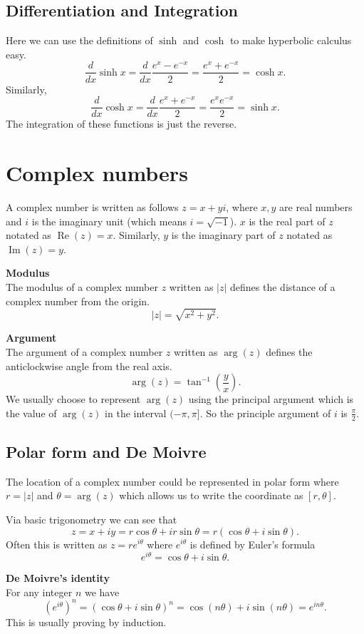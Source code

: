 \documentclass[10pt, a4paper]{article}
\begin{document}
\subsection{Differentiation and Integration}
Here we can use the definitions of $\sinh$ and $\cosh$ to make hyperbolic calculus easy.
\[
\frac{d}{dx}\sinh x = \frac{d}{dx}\frac{e ^ x - e ^ {-x}}{2} = \frac{e ^ x + e ^ {-x}}{2} = \cosh x.
\]
Similarly,
\[
\frac{d}{dx}\cosh x = \frac{d}{dx}\frac{e ^ x + e ^ {-x}}{2} = \frac{e ^ x  e ^ {-x}}{2} = \sinh x.
\]
The integration of these functions is just the reverse.

\newpage

\section{Complex numbers}
A complex number is written as follows $z = x + yi$, where $x, y$ are real numbers and $i$ is the imaginary unit (which means $i = \sqrt{-1}$). $x$ is the real part of $z$ notated as $\operatorname{Re}(z) = x$. Similarly, $y$ is the imaginary part of $z$ notated as $\operatorname{Im}(z) = y$.

\textbf{Modulus} \\
The modulus of a complex number $z$ written as $|z|$ defines the distance of a complex number from the origin.
\[
|z| = \sqrt{x ^ 2 + y ^ 2}.
\]

\textbf{Argument} \\
The argument of a complex number $z$ written as $\arg (z)$ defines the anticlockwise angle from the real axis. 
\[
\arg (z) = \tan ^ {-1} \left(\frac{y}{x}\right).
\]
We usually choose to represent $\arg (z)$ using the principal argument which is the value of $\arg (z)$ in the interval $(-\pi, \pi]$. So the principle argument of $i$ is $\frac{\pi}{2}$.

\subsection{Polar form and De Moivre}
The location of a complex number could be represented in polar form where $r = |z|$ and $\theta = \arg (z)$ which allows us to write the coordinate as $[r, \theta]$.

Via basic trigonometry we can see that
\[
z = x + iy = r\cos\theta + ir\sin\theta = r(\cos\theta + i\sin\theta).
\]
Often this is written as $z = re ^ {i\theta}$ where $e ^ {i\theta}$ is defined by Euler's formula
\[
e ^ {i\theta} = \cos\theta + i\sin\theta.
\]

\textbf{De Moivre's identity} \\
For any integer $n$ we have
\[
\left(e ^ {i\theta}\right) ^ n = (\cos\theta + i\sin\theta) ^ n = \cos (n\theta) + i\sin (n\theta) = e ^ {in\theta}.
\]
This is usually proving by induction.
\end{document}

